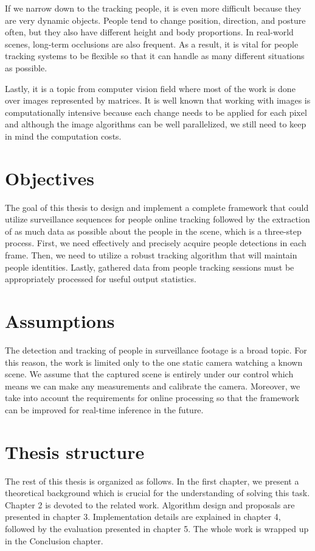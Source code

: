 \begin{introduction}
        If we narrow down to the tracking people, it is even more difficult because they are very dynamic objects. People tend to change position, direction, and posture often, but they also have different height and body proportions. In real-world scenes, long-term occlusions are also frequent. As a result, it is vital for people tracking systems to be flexible so that it can handle as many different situations as possible.  
        
        Lastly, it is a topic from computer vision field where most of the work is done over images represented by matrices. It is well known that working with images is computationally intensive because each change needs to be applied for each pixel and although the image algorithms can be well parallelized, we still need to keep in mind the computation costs. 
    
    \section{Objectives}
        The goal of this thesis to design and implement a complete framework that could utilize surveillance sequences for people online tracking followed by the extraction of as much data as possible about the people in the scene, which is a three-step process. First, we need effectively and precisely acquire people detections in each frame. Then, we need to utilize a robust tracking algorithm that will maintain people identities. Lastly, gathered data from people tracking sessions must be appropriately processed for useful output statistics.
    
    \section{Assumptions}   
        The detection and tracking of people in surveillance footage is a broad topic. For this reason, the work is limited only to the one static camera watching a known scene. We assume that the captured scene is entirely under our control which means we can make any measurements and calibrate the camera. Moreover, we take into account the requirements for online processing so that the framework can be improved for real-time inference in the future. 
    
    \section{Thesis structure}
        The rest of this thesis is organized as follows. In the first chapter, we present a theoretical background which is crucial for the understanding of solving this task. Chapter 2 is devoted to the related work. Algorithm design and proposals are presented in chapter 3. Implementation details are explained in chapter 4, followed by the evaluation presented in chapter 5. The whole work is wrapped up in the Conclusion chapter.
    
\end{introduction}